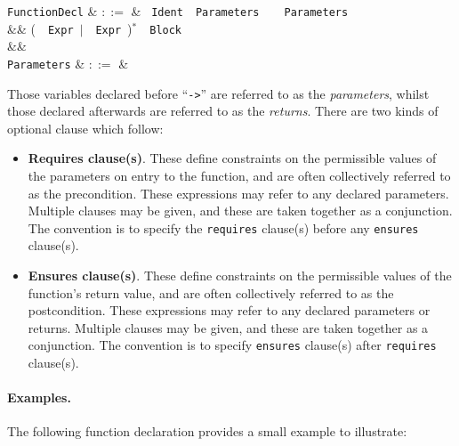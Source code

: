 \begin{syntax}
  \verb+FunctionDecl+ & $::=$ & \ \verb+Ident+\ \token{(}\ \verb+Parameters+\ \token{)}\ \token{->}\ \token{(}\ \verb+Parameters+\ \token{)}\\
  && \big(\ \ \verb+Expr+\ $|$\ \ \verb+Expr+\ \big)$^*$\ \token{:}\ \verb+Block+\\
  &&\\
  \verb+Parameters+ & $::=$ & 
\end{syntax}

Those variables declared before ``\lstinline{->}'' are referred to as the {\em parameters}, whilst those declared afterwards are referred to as the {\em returns}.  There are two kinds of optional clause which follow:

\begin{itemize}

\item {\bf Requires clause(s)}. These define constraints on the permissible values of the parameters on entry to the function, and are often collectively referred to as the \gls{precondition}. These expressions may refer to any declared parameters.  Multiple clauses may be given, and these are taken together as a conjunction.  The convention is to specify the \lstinline{requires} clause(s) before any \lstinline{ensures} clause(s).

\item {\bf Ensures clause(s)}. These define constraints on the permissible values of the function's return value, and are often collectively referred to as the \gls{postcondition}. These expressions may refer to any declared parameters or returns.  Multiple clauses may be given, and these are taken together as a conjunction.  The convention is to specify \lstinline{ensures} clause(s) after \lstinline{requires} clause(s).
\end{itemize}

\paragraph{Examples.}
The following function declaration provides a small example to illustrate:

